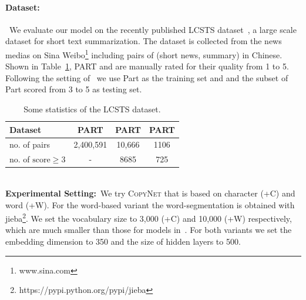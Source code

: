 \paragraph{Dataset:}~We evaluate our model on the recently published LCSTS dataset~\cite{hu2015lcsts},  a large scale dataset for short text summarization. The dataset is collected from the news medias on Sina Weibo\footnote{www.sina.com} including pairs of (short news, summary) in Chinese. Shown in Table~\ref{table-lcsts},  PART \uppercase\expandafter{}  and  \uppercase\expandafter{} are manually rated for their quality from 1 to 5. Following the setting of~\cite{hu2015lcsts} we use Part \uppercase\expandafter{}  as the training set and and the subset of Part  \uppercase\expandafter{} scored from 3 to 5 as testing set. \vspace{-5pt}
 \begin{table}[!ht] %
\small
\centering
\begin{tabular}{l|ccc}
\toprule
Dataset & PART \uppercase\expandafter{\romannumeral1}  & PART \uppercase\expandafter{\romannumeral2}  & PART \uppercase\expandafter{\romannumeral3} \\
\midrule
no. of pairs & 2,400,591  &  10,666 & 1106\\
no. of $\text{score} \geq 3$ & - & 8685 & 725 \\
\bottomrule
\end{tabular} \vspace{-5pt}
\caption{\label{table-lcsts} Some statistics of the LCSTS dataset.} %
 \vspace{-8pt}
\end{table}%
\\\textbf{Experimental Setting:}~We try \textsc{CopyNet} that is based on character (+C) and word (+W). For the word-based variant the word-segmentation is obtained with jieba\footnote{https://pypi.python.org/pypi/jieba}. We set the vocabulary size to 3,000 (+C) and 10,000 (+W) respectively, which are much smaller than those for models in~\cite{hu2015lcsts}. For both variants we set the embedding dimension to 350 and the size of hidden layers to 500. %
